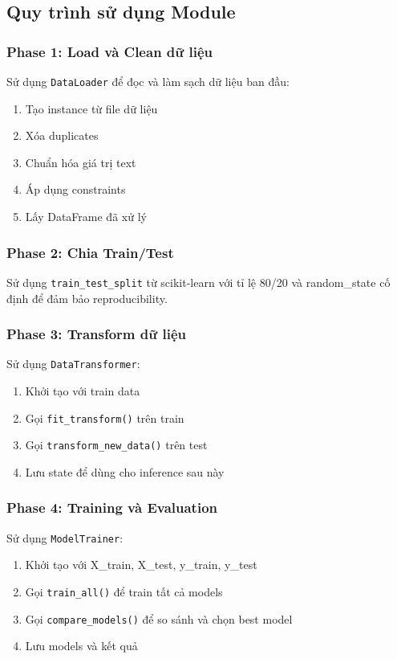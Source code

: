 \documentclass[12pt,a4paper]{article}
\begin{document}
\subsection{Quy trình sử dụng Module}

\subsubsection{Phase 1: Load và Clean dữ liệu}

Sử dụng \texttt{DataLoader} để đọc và làm sạch dữ liệu ban đầu:
\begin{enumerate}
    \item Tạo instance từ file dữ liệu
    \item Xóa duplicates
    \item Chuẩn hóa giá trị text
    \item Áp dụng constraints
    \item Lấy DataFrame đã xử lý
\end{enumerate}

\subsubsection{Phase 2: Chia Train/Test}

Sử dụng \texttt{train\_test\_split} từ scikit-learn với tỉ lệ 80/20 và random\_state cố định để đảm bảo reproducibility.

\subsubsection{Phase 3: Transform dữ liệu}

Sử dụng \texttt{DataTransformer}:
\begin{enumerate}
    \item Khởi tạo với train data
    \item Gọi \texttt{fit\_transform()} trên train
    \item Gọi \texttt{transform\_new\_data()} trên test
    \item Lưu state để dùng cho inference sau này
\end{enumerate}

\subsubsection{Phase 4: Training và Evaluation}

Sử dụng \texttt{ModelTrainer}:
\begin{enumerate}
    \item Khởi tạo với X\_train, X\_test, y\_train, y\_test
    \item Gọi \texttt{train\_all()} để train tất cả models
    \item Gọi \texttt{compare\_models()} để so sánh và chọn best model
    \item Lưu models và kết quả
\end{enumerate}
\end{document}
